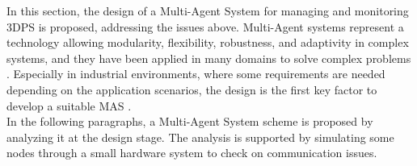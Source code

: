 In this section, the design of a Multi-Agent System for managing and monitoring 3DPS is proposed, addressing the issues above. Multi-Agent systems \parencite{wooldridge_introduction_2009} represent a technology allowing modularity, flexibility, robustness, and adaptivity in complex systems, and they have been applied in many domains to solve complex problems \parencite{loia_using_2017}\parencite{daniello_multi-agent_2015}\parencite{daniello_self-regulated_2018}. Especially in industrial environments, where some requirements are needed depending on the application scenarios, the design is the first key factor to develop a suitable MAS \parencite{karnouskos_key_2017}.\\
In the following paragraphs, a Multi-Agent System scheme is proposed by analyzing it at the design stage. The analysis is supported by simulating some nodes through a small hardware system to check on communication issues.
